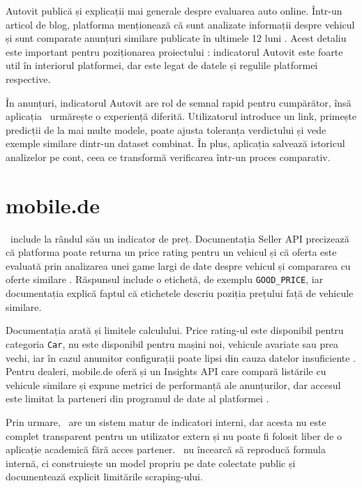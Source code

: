 Autovit publică și explicații mai generale despre evaluarea auto online. Într-un articol de blog, platforma menționează că sunt analizate informații despre vehicul și sunt comparate anunțuri similare publicate în ultimele 12 luni \cite{autovit_evaluare_blog}. Acest detaliu este important pentru poziționarea proiectului \project: indicatorul Autovit este foarte util în interiorul platformei, dar este legat de datele și regulile platformei respective.

În anunțuri, indicatorul Autovit are rol de semnal rapid pentru cumpărător, însă aplicația \project\ urmărește o experiență diferită. Utilizatorul introduce un link, primește predicții de la mai multe modele, poate ajusta toleranța verdictului și vede exemple similare dintr-un dataset combinat. În plus, aplicația salvează istoricul analizelor pe cont, ceea ce transformă verificarea într-un proces comparativ.

\section{mobile.de}
\label{sec:market-mobilede}

\mobilede\ include la rândul său un indicator de preț. Documentația Seller API precizează că platforma poate returna un price rating pentru un vehicul și că oferta este evaluată prin analizarea unei game largi de date despre vehicul și compararea cu oferte similare \cite{mobilede_seller_api}. Răspunsul include o etichetă, de exemplu \texttt{GOOD\_PRICE}, iar documentația explică faptul că etichetele descriu poziția prețului față de vehicule similare.

Documentația arată și limitele calculului. Price rating-ul este disponibil pentru categoria \texttt{Car}, nu este disponibil pentru mașini noi, vehicule avariate sau prea vechi, iar în cazul anumitor configurații poate lipsi din cauza datelor insuficiente \cite{mobilede_seller_api}. Pentru dealeri, mobile.de oferă și un Insights API care compară listările cu vehicule similare și expune metrici de performanță ale anunțurilor, dar accesul este limitat la parteneri din programul de date al platformei \cite{mobilede_insights_api}.

Prin urmare, \mobilede\ are un sistem matur de indicatori interni, dar acesta nu este complet transparent pentru un utilizator extern și nu poate fi folosit liber de o aplicație academică fără acces partener. \project\ nu încearcă să reproducă formula internă, ci construiește un model propriu pe date colectate public și documentează explicit limitările scraping-ului.

